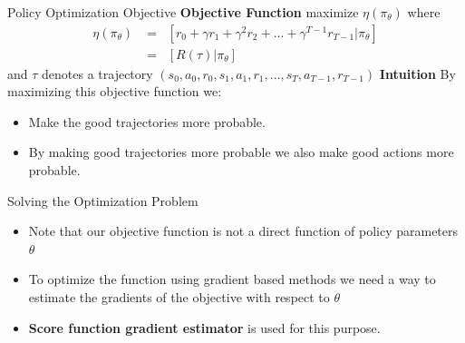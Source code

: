 \begin{frame}{Policy Optimization Objective}
\textbf{Objective Function}
\newline
maximize $\eta(\pi_{\theta})$
\newline
where
\begin{equation}
    \begin{split}
        \eta(\pi_{\theta}) & = \mathop{\mathbb{E}_{\tau}}[r_0 + \gamma r_1 + \gamma^2 r_2 + ... + \gamma^{T-1}r_{T-1}|\pi_{\theta}]\\
        & = \mathop{\mathbb{E}_{\tau}}[R(\tau)|\pi_{\theta}]
    \end{split}
\end{equation}
and $\tau$ denotes a trajectory $(s_0,a_0,r_0,s_1,a_1,r_1,...,s_T, a_{T-1}, r_{T-1})$
\newline
\textbf{Intuition}
\newline
By maximizing this objective function we:
\begin{itemize}
    \item Make the good trajectories more probable.
    \item By making good trajectories more probable we also make good actions more probable.
\end{itemize}
\end{frame}
\begin{frame}{Solving the Optimization Problem}
\begin{itemize}
    \item Note that our objective function is not a direct function of policy parameters $\theta$
    \item To optimize the function using gradient based methods we need a way to estimate the gradients of the objective with respect to $\theta$
    \item \textbf{Score function gradient estimator}  is used for this purpose.
\end{itemize}
    
\end{frame}

